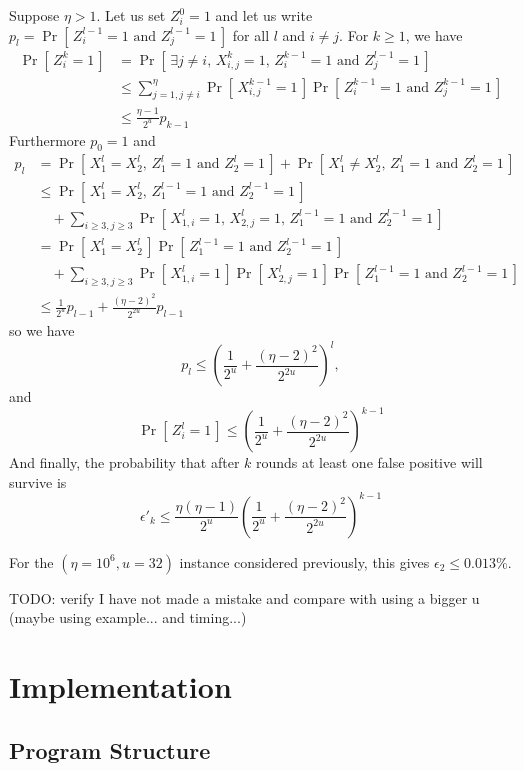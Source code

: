 \documentclass[11pt]{llncs}
\newcommand{\Prob}[1]{{\Pr\left[\,{#1}\,\right]}}
\begin{document}
Suppose $\eta > 1$. 
Let us set $Z^0_i = 1$ and let us write $p_l = \Prob{Z^{l-1}_{i} = 1 \text{ and } Z^{l-1}_{j} = 1} $ for all $l$ and $i \neq j$.
For $k \ge 1$, we have
\begin{align*} 
\Prob{Z^k_i=1} &= \Prob{\exists j\neq i \text{, } X^k_{i,j} = 1 \text{, } Z^{k-1}_{i} = 1  \text{ and } Z^{l-1}_{j} = 1}  \\ 
&\le \sum_{j=1, j\neq i}^\eta \Prob{X^{k-1}_{i,j} = 1} \Prob{Z^{k-1}_{i} = 1 \text{ and } Z^{k-1}_{j} = 1}  \\ 
&\le \frac{\eta-1}{2^u} p_{k-1}
\end{align*}
Furthermore $p_0 = 1$ and
\begin{align*}
p_l &= \Prob{X^{l}_1 = X^{l}_2 \text{, } Z^{l}_{1} = 1 \text{ and } Z^{l}_{2} = 1}
  + \Prob{X^{l}_1 \neq X^{l}_2 \text{, } Z^{l}_{1} = 1 \text{ and } Z^{l}_{2} = 1} \\
&\le \Prob{X^{l}_1 = X^{l}_2 \text{, } Z^{l-1}_{1} = 1 \text{ and } Z^{l-1}_{2} = 1} \\
  &\quad+ \sum_{i \ge 3, j \ge 3} \Prob{X^l_{1,i} = 1 \text{, } X^l_{2,j} = 1 \text{, } Z^{l-1}_{1} = 1 \text{ and } Z^{l-1}_{2} = 1} \\
&= \Prob{X^{l}_1 = X^{l}_2} \Prob{Z^{l-1}_{1} = 1 \text{ and } Z^{l-1}_{2} = 1} \\
  &\quad+ \sum_{i \ge 3, j \ge 3} \Prob{X^l_{1,i} = 1} \Prob{X^l_{2,j} = 1} \Prob{Z^{l-1}_{1} = 1 \text{ and } Z^{l-1}_{2} = 1} \\
&\le \frac{1}{2^u} p_{l-1} + \frac{(\eta-2)^2}{2^{2u}} p_{l-1}
\end{align*}
so we have
\[ p_l \le \left( \frac{1}{2^u} + \frac{(\eta-2)^2}{2^{2u}} \right)^l, \]
and
\[ \Prob{Z^l_i=1} \le \left( \frac{1}{2^u} + \frac{(\eta-2)^2}{2^{2u}} \right)^{k-1} \]
And finally, the probability that after $k$ rounds at least one false positive will survive is
\[
\epsilon'_k \le \frac{\eta(\eta-1)}{2^u} \left( \frac{1}{2^u} + \frac{(\eta-2)^2}{2^{2u}} \right)^{k-1}
\]

For the $(\eta=10^6,u=32)$ instance considered previously, this gives $\epsilon_2 \le 0.013\%$.

TODO: verify I have not made a mistake and compare with using a bigger u (maybe using example... and timing...)

\section{Implementation}

\subsection{Program Structure}
\end{document}
